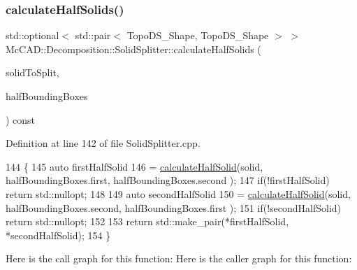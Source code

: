 \subsubsection{\texorpdfstring{calculate\+Half\+Solids()}{calculateHalfSolids()}\hspace{0.1cm}{\footnotesize\ttfamily [1/2]}}
{\footnotesize\ttfamily std\+::optional$<$ std\+::pair$<$ Topo\+D\+S\+\_\+\+Shape, Topo\+D\+S\+\_\+\+Shape $>$ $>$ Mc\+C\+A\+D\+::\+Decomposition\+::\+Solid\+Splitter\+::calculate\+Half\+Solids (\begin{DoxyParamCaption}\item[{const Topo\+D\+S\+\_\+\+Solid \&}]{solid\+To\+Split,  }\item[{const \hyperlink{classMcCAD_1_1Decomposition_1_1SolidSplitter_a6d92618f3790cfc7403c6f421bd66411}{Shape\+Pair} \&}]{half\+Bounding\+Boxes }\end{DoxyParamCaption}) const\hspace{0.3cm}{\ttfamily [private]}}



Definition at line 142 of file Solid\+Splitter.\+cpp.


\begin{DoxyCode}
144                                                  \{
145     \textcolor{keyword}{auto} firstHalfSolid
146             = \hyperlink{classMcCAD_1_1Decomposition_1_1SolidSplitter_aa2399efe97e9013c846b4c41907c9339}{calculateHalfSolid}(solid, halfBoundingBoxes.first, halfBoundingBoxes.second
      );
147     \textcolor{keywordflow}{if}(!firstHalfSolid) \textcolor{keywordflow}{return} std::nullopt;
148 
149     \textcolor{keyword}{auto} secondHalfSolid
150             = \hyperlink{classMcCAD_1_1Decomposition_1_1SolidSplitter_aa2399efe97e9013c846b4c41907c9339}{calculateHalfSolid}(solid, halfBoundingBoxes.second, halfBoundingBoxes.first
      );
151     \textcolor{keywordflow}{if}(!secondHalfSolid) \textcolor{keywordflow}{return} std::nullopt;
152 
153     \textcolor{keywordflow}{return} std::make\_pair(*firstHalfSolid, *secondHalfSolid);
154 \}
\end{DoxyCode}
Here is the call graph for this function\+:
Here is the caller graph for this function\+:
\mbox{\label{classMcCAD_1_1Decomposition_1_1SolidSplitter_aa46ed151e82f31710667cc420225ca7c}} 
